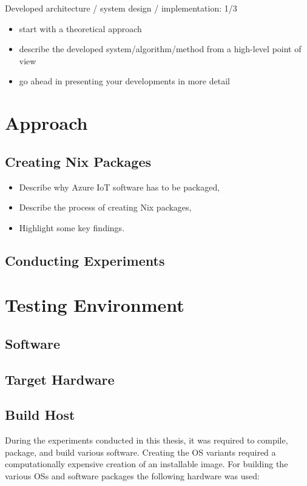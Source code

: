 \begin{tcolorbox}[title=TODO]
Developed architecture / system design / implementation: 1/3

\begin{itemize}
\item start with a theoretical approach
\item describe the developed system/algorithm/method from a high-level point of view
\item go ahead in presenting your developments in more detail
\end{itemize}
\end{tcolorbox}

\section{Approach}
\subsection{Creating Nix Packages}
\begin{tcolorbox}[title=TODO]
\begin{itemize}
    \item Describe why Azure IoT software has to be packaged,
    \item Describe the process of creating Nix packages,
    \item Highlight some key findings.
\end{itemize}
\end{tcolorbox}

\subsection{Conducting Experiments}
\section{Testing Environment}
\subsection{Software}
\subsection{Target Hardware}
\subsection{Build Host}
During the experiments conducted in this thesis, it was required to compile,
package, and build various software. Creating the \ac{OS} variants required a
computationally expensive
creation of an installable image. For building the
various \ac{OS}s and software packages the following hardware was used:

